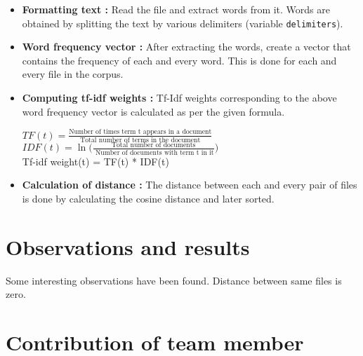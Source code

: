 \begin{itemize}
	\item \textbf{Formatting text :} Read the file and extract words from it. Words are obtained by splitting the text by various delimiters (variable \verb|delimiters|).
	\item \textbf{Word frequency vector :} After extracting the words, create a vector that contains the frequency of each and every word. This is done for each and every file in the corpus.
	\item \textbf{Computing tf-idf weights :} Tf-Idf weights corresponding to the above word frequency vector is calculated as per the given formula.
	\begin{center}
		$TF(t) = \frac{\text{Number of times term t appears in a document}}{\text{Total number of terms in the document}}$\\ 
		\vspace{1.2em}
		$IDF(t) = \ln \big( {\frac{\text{Total number of documents}}{\text{ Number of documents with term t in it}}} \big) $\\
		\vspace{1.2em}
		Tf-idf weight(t) = TF(t) * IDF(t)
	\end{center}
	\item \textbf{Calculation of distance :} The distance between each and every pair of files is done by calculating the cosine distance and later sorted. 
\end{itemize}

\section{Observations and results}
\label{sec:p01}

Some interesting observations have been found. Distance between same files is zero. 



\section{Contribution of team member}
